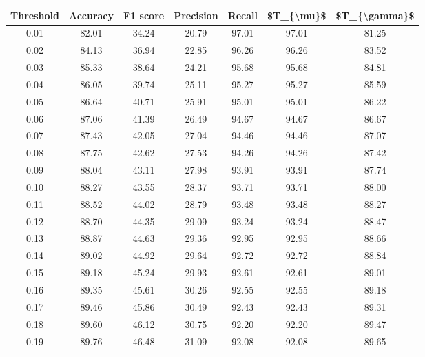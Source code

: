 \begin{tabular}{|c|c|c|c|c|c|c|}
\hline
 Threshold &  Accuracy &  F1 score &  Precision &  Recall &  \$T\_\{\textbackslash mu\}\$ &  \$T\_\{\textbackslash gamma\}\$ \\
\hline
      0.01 &     82.01 &     34.24 &      20.79 &   97.01 &      97.01 &         81.25 \\
      0.02 &     84.13 &     36.94 &      22.85 &   96.26 &      96.26 &         83.52 \\
      0.03 &     85.33 &     38.64 &      24.21 &   95.68 &      95.68 &         84.81 \\
      0.04 &     86.05 &     39.74 &      25.11 &   95.27 &      95.27 &         85.59 \\
      0.05 &     86.64 &     40.71 &      25.91 &   95.01 &      95.01 &         86.22 \\
      0.06 &     87.06 &     41.39 &      26.49 &   94.67 &      94.67 &         86.67 \\
      0.07 &     87.43 &     42.05 &      27.04 &   94.46 &      94.46 &         87.07 \\
      0.08 &     87.75 &     42.62 &      27.53 &   94.26 &      94.26 &         87.42 \\
      0.09 &     88.04 &     43.11 &      27.98 &   93.91 &      93.91 &         87.74 \\
      0.10 &     88.27 &     43.55 &      28.37 &   93.71 &      93.71 &         88.00 \\
      0.11 &     88.52 &     44.02 &      28.79 &   93.48 &      93.48 &         88.27 \\
      0.12 &     88.70 &     44.35 &      29.09 &   93.24 &      93.24 &         88.47 \\
      0.13 &     88.87 &     44.63 &      29.36 &   92.95 &      92.95 &         88.66 \\
      0.14 &     89.02 &     44.92 &      29.64 &   92.72 &      92.72 &         88.84 \\
      0.15 &     89.18 &     45.24 &      29.93 &   92.61 &      92.61 &         89.01 \\
      0.16 &     89.35 &     45.61 &      30.26 &   92.55 &      92.55 &         89.18 \\
      0.17 &     89.46 &     45.86 &      30.49 &   92.43 &      92.43 &         89.31 \\
      0.18 &     89.60 &     46.12 &      30.75 &   92.20 &      92.20 &         89.47 \\
      0.19 &     89.76 &     46.48 &      31.09 &   92.08 &      92.08 &         89.65 \\

\end{tabular}
